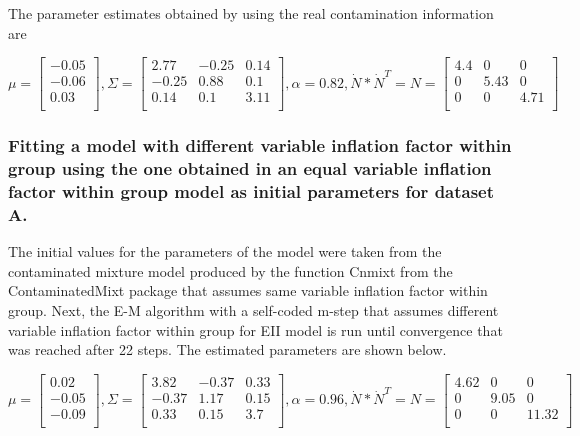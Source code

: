 \documentclass[
]{article}
\begin{document}
The parameter estimates obtained by using the real contamination
information are

\[
\mu = \begin{bmatrix}-0.05 \\-0.06 \\0.03 \\\end{bmatrix} , \Sigma = \begin{bmatrix}2.77&-0.25&0.14 \\-0.25&0.88&0.1 \\0.14&0.1&3.11 \\\end{bmatrix} , \alpha = 0.82, \dot{N} * \dot{N}^{T} = N = \begin{bmatrix}4.4&0&0 \\0&5.43&0 \\0&0&4.71 \\\end{bmatrix}
\]

\hypertarget{fitting-a-model-with-different-variable-inflation-factor-within-group-using-the-one-obtained-in-an-equal-variable-inflation-factor-within-group-model-as-initial-parameters-for-dataset-a.}{%
\subsubsection{Fitting a model with different variable inflation factor
within group using the one obtained in an equal variable inflation
factor within group model as initial parameters for dataset
A.}\label{fitting-a-model-with-different-variable-inflation-factor-within-group-using-the-one-obtained-in-an-equal-variable-inflation-factor-within-group-model-as-initial-parameters-for-dataset-a.}}

The initial values for the parameters of the model were taken from the
contaminated mixture model produced by the function Cnmixt from the
ContaminatedMixt package that assumes same variable inflation factor
within group. Next, the E-M algorithm with a self-coded m-step that
assumes different variable inflation factor within group for EII model
is run until convergence that was reached after 22 steps. The estimated
parameters are shown below.

\[
\mu = \begin{bmatrix}0.02 \\-0.05 \\-0.09 \\\end{bmatrix} , \Sigma = \begin{bmatrix}3.82&-0.37&0.33 \\-0.37&1.17&0.15 \\0.33&0.15&3.7 \\\end{bmatrix} , \alpha = 0.96, \dot{N} * \dot{N}^{T} = N = \begin{bmatrix}4.62&0&0 \\0&9.05&0 \\0&0&11.32 \\\end{bmatrix}
\]
\end{document}
